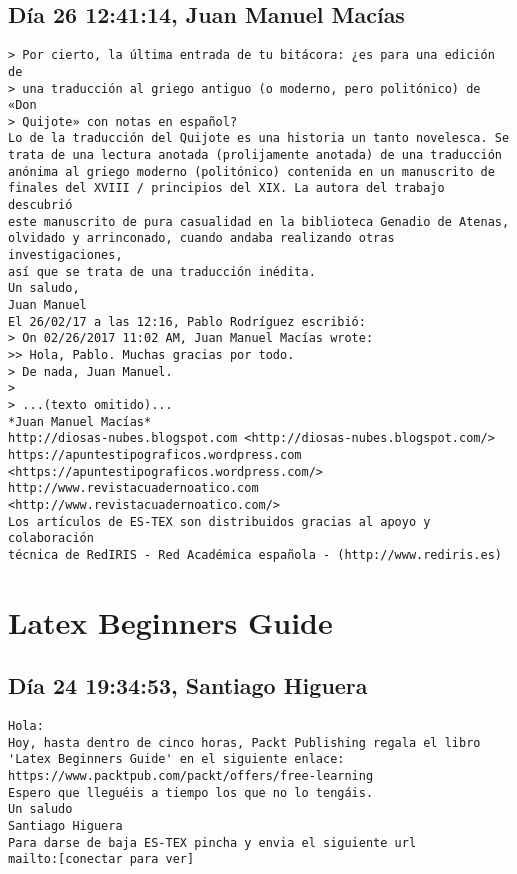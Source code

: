 \documentclass[a4paper,10pt]{article}
\begin{document}
\subsection{Día 26 12:41:14, Juan Manuel Macías}

\begin{lstlisting}
> Por cierto, la última entrada de tu bitácora: ¿es para una edición de
> una traducción al griego antiguo (o moderno, pero politónico) de «Don
> Quijote» con notas en español?
Lo de la traducción del Quijote es una historia un tanto novelesca. Se 
trata de una lectura anotada (prolijamente anotada) de una traducción 
anónima al griego moderno (politónico) contenida en un manuscrito de 
finales del XVIII / principios del XIX. La autora del trabajo descubrió 
este manuscrito de pura casualidad en la biblioteca Genadio de Atenas, 
olvidado y arrinconado, cuando andaba realizando otras investigaciones, 
así que se trata de una traducción inédita.
Un saludo,
Juan Manuel
El 26/02/17 a las 12:16, Pablo Rodríguez escribió:
> On 02/26/2017 11:02 AM, Juan Manuel Macías wrote:
>> Hola, Pablo. Muchas gracias por todo.
> De nada, Juan Manuel.
>
> ...(texto omitido)...
*Juan Manuel Macías*
http://diosas-nubes.blogspot.com <http://diosas-nubes.blogspot.com/>
https://apuntestipograficos.wordpress.com 
<https://apuntestipograficos.wordpress.com/>
http://www.revistacuadernoatico.com <http://www.revistacuadernoatico.com/>
Los artículos de ES-TEX son distribuidos gracias al apoyo y colaboración 
técnica de RedIRIS - Red Académica española - (http://www.rediris.es)

\end{lstlisting}
\section{Latex Beginners Guide}

\subsection{Día 24 19:34:53, Santiago Higuera}

\begin{lstlisting}
Hola:
Hoy, hasta dentro de cinco horas, Packt Publishing regala el libro 
'Latex Beginners Guide' en el siguiente enlace:
https://www.packtpub.com/packt/offers/free-learning
Espero que lleguéis a tiempo los que no lo tengáis.
Un saludo
Santiago Higuera
Para darse de baja ES-TEX pincha y envia el siguiente url
mailto:[conectar para ver]

\end{lstlisting}
\end{document}
